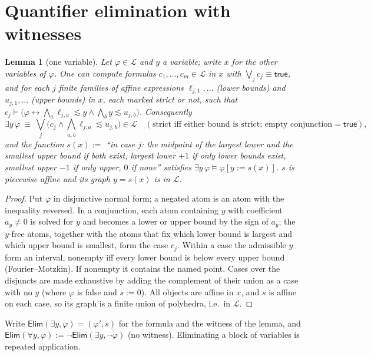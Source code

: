 \documentclass[10pt]{article}
\theoremstyle{plain}\newtheorem{theorem}{Theorem}\newtheorem{lemma}{Lemma}
\theoremstyle{definition}\newtheorem{definition}{Definition}
\newcommand{\ELIM}{\mathsf{Elim}}\newcommand{\TRUE}{\mathsf{true}}
\begin{document}
\section{Quantifier elimination with witnesses}
\begin{lemma}[one variable]\label{lem:elim}
Let $\varphi\in\mathcal L$ and $y$ a variable; write $x$ for the other variables of $\varphi$. One can compute formulas $c_1,\dots,c_m\in\mathcal L$ in $x$ with $\bigvee_jc_j\equiv\TRUE$, and for each $j$ finite families of affine expressions $\ell_{j,1},\dots$ (lower bounds) and $u_{j,1},\dots$ (upper bounds) in $x$, each marked strict or not, such that $c_j\models\big(\varphi\leftrightarrow\bigwedge_a\ell_{j,a}\lesssim y\wedge\bigwedge_b y\lesssim u_{j,b}\big)$. Consequently
\[
\exists y\,\varphi\ \equiv\ \bigvee_j\Big(c_j\wedge\bigwedge_{a,b}\ell_{j,a}\lesssim u_{j,b}\Big)\in\mathcal L\quad(\text{strict iff either bound is strict; empty conjunction}=\TRUE),
\]
and the function $s(x):=$ ``in case $j$: the midpoint of the largest lower and the smallest upper bound if both exist, largest lower $+1$ if only lower bounds exist, smallest upper $-1$ if only upper, $0$ if none'' satisfies $\exists y\,\varphi\models\varphi[y:=s(x)]$. $s$ is piecewise affine and its graph $y=s(x)$ is in $\mathcal L$.
\end{lemma}
\begin{proof}
Put $\varphi$ in disjunctive normal form; a negated atom is an atom with the inequality reversed. In a conjunction, each atom containing $y$ with coefficient $a_y\neq0$ is solved for $y$ and becomes a lower or upper bound by the sign of $a_y$; the $y$-free atoms, together with the atoms that fix which lower bound is largest and which upper bound is smallest, form the case $c_j$. Within a case the admissible $y$ form an interval, nonempty iff every lower bound is below every upper bound (Fourier--Motzkin). If nonempty it contains the named point. Cases over the disjuncts are made exhaustive by adding the complement of their union as a case with no $y$ (where $\varphi$ is false and $s:=0$). All objects are affine in $x$, and $s$ is affine on each case, so its graph is a finite union of polyhedra, i.e.\ in $\mathcal L$.
\end{proof}
Write $\ELIM(\exists y,\varphi)=(\varphi',s)$ for the formula and the witness of the lemma, and $\ELIM(\forall y,\varphi):=\neg\ELIM(\exists y,\neg\varphi)$ (no witness). Eliminating a block of variables is repeated application.
\end{document}
